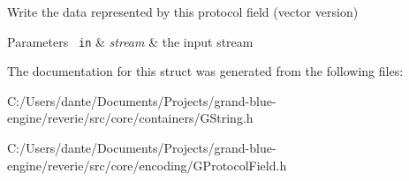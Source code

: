 Write the data represented by this protocol field (vector version) 


\begin{DoxyParams}[1]{Parameters}
\mbox{\texttt{ in}}  & {\em stream} & the input stream \\
\hline
\end{DoxyParams}


The documentation for this struct was generated from the following files\+:\begin{DoxyCompactItemize}
\item 
C\+:/\+Users/dante/\+Documents/\+Projects/grand-\/blue-\/engine/reverie/src/core/containers/G\+String.\+h\item 
C\+:/\+Users/dante/\+Documents/\+Projects/grand-\/blue-\/engine/reverie/src/core/encoding/G\+Protocol\+Field.\+h\end{DoxyCompactItemize}
